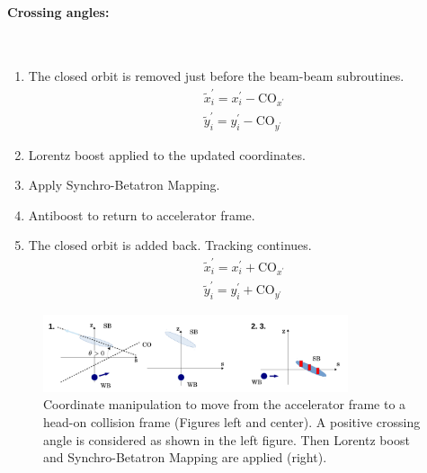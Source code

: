 \paragraph{Crossing angles:}~\\
\begin{enumerate}
    \item The closed orbit is removed just before the beam-beam subroutines.
        \begin{eqnarray*}
            \tilde x^{\prime}_{i} = x^{\prime}_{i} - \mathrm{CO}_{x^{\prime}} \\
            \tilde y^{\prime}_{i} = y^{\prime}_{i} - \mathrm{CO}_{y^{\prime}}
        \end{eqnarray*}
    \item Lorentz boost applied to the updated coordinates.
    \item Apply Synchro-Betatron Mapping.
    \item Antiboost to return to accelerator frame.
    \item The closed orbit is added back. Tracking continues.
        \begin{eqnarray*}
            \tilde x^{\prime}_{i} = x^{\prime}_{i} + \mathrm{CO}_{x^{\prime}} \\
            \tilde y^{\prime}_{i} = y^{\prime}_{i} + \mathrm{CO}_{y^{\prime}}
        \end{eqnarray*}
\end{enumerate}
\begin{figure}[h]
    \begin{center}
    \includegraphics[width=0.8\textwidth]{figures/BB_xsing}
    \caption{Coordinate manipulation to move from the accelerator frame to a head-on collision frame (Figures left and center). A positive crossing angle is considered as shown in the left figure. Then Lorentz boost and Synchro-Betatron Mapping are applied (right).}
    \label{fig:BB_xsing}
    \end{center}
\end{figure}

